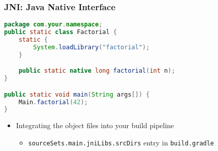 \documentclass[10pt,mathserif]{beamer}
\begin{document}
	\begin{frame}[fragile]
		\frametitle{JNI: Java Native Interface}



		\begin{lstlisting}[language=java]
package com.your.namespace;
public static class Factorial {
	static {
		System.loadLibrary("factorial");
	}

	public static native long factorial(int n);
}

public static void main(String args[]) {
	Main.factorial(42);
}
		\end{lstlisting}

		\begin{itemize}
			\item Integrating the object files into your build pipeline
			\begin{itemize}
				\item \lstinline{sourceSets.main.jniLibs.srcDirs} entry in \lstinline{build.gradle}
			\end{itemize}
		\end{itemize}
	\end{frame}
\end{document}
